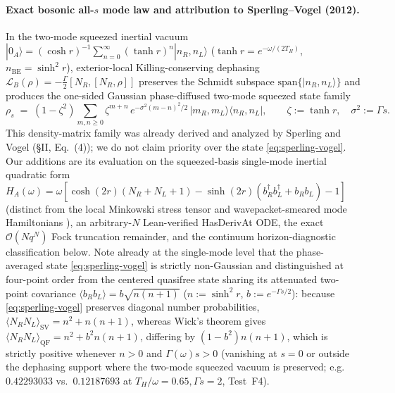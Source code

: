 \documentclass[11pt,a4paper]{article}
\theoremstyle{definition}
\theoremstyle{remark}
\newcommand{\cL}{\mathcal{L}}
\newcommand{\1}{\mathbf{1}}
\newcommand{\code}[1]{{\scriptsize\ttfamily #1}}
\begin{document}
\paragraph{Exact bosonic all-$s$ mode law and attribution to Sperling--Vogel (2012).}
In the two-mode squeezed inertial vacuum $|0_A\rangle = (\cosh r)^{-1}\sum_{n=0}^\infty (\tanh r)^n |n_R,n_L\rangle$ ($\tanh r = e^{-\omega/(2T_H)}$, $n_{\mathrm{BE}}=\sinh^2 r$), exterior-local Killing-conserving dephasing $\cL_B(\rho)=-\frac{\Gamma}{2}[N_R,[N_R,\rho]]$ preserves the Schmidt subspace $\mathrm{span}\{|n_R,n_L\rangle\}$ and produces the one-sided Gaussian phase-diffused two-mode squeezed state family
\begin{equation}\label{eq:sperling-vogel}
  \rho_s \;=\; (1-\zeta^2)\sum_{m,n\ge 0} \zeta^{m+n}\,e^{-\sigma^2(m-n)^2/2}\,|m_R,m_L\rangle\langle n_R,n_L|, \qquad
  \zeta := \tanh r,\quad \sigma^2 := \Gamma s.
\end{equation}
This density-matrix family was already derived and analyzed by Sperling and Vogel \cite{SperlingVogel2012} (\S II, Eq.~(4)); we do not claim priority over the state \eqref{eq:sperling-vogel}. Our additions are its evaluation on the squeezed-basis single-mode inertial quadratic form $H_A(\omega) = \omega[\cosh(2r)(N_R+N_L+1)-\sinh(2r)(b_R^\dagger b_L^\dagger+b_R b_L)-1]$ (distinct from the local Minkowski stress tensor and wavepacket-smeared mode Hamiltonians \cite{Bruschi2010}), an arbitrary-$N$ Lean-verified \code{HasDerivAt} ODE, the exact $\mathcal{O}(Nq^N)$ Fock truncation remainder, and the continuum horizon-diagnostic classification below. Note already at the single-mode level that the phase-averaged state \eqref{eq:sperling-vogel} is strictly non-Gaussian and distinguished at four-point order from the centered quasifree state sharing its attenuated two-point covariance $\langle b_R b_L\rangle = b\sqrt{n(n+1)}$ ($n:=\sinh^2 r$, $b:=e^{-\Gamma s/2}$): because \eqref{eq:sperling-vogel} preserves diagonal number probabilities, $\langle N_R N_L\rangle_{\mathrm{SV}} = n^2 + n(n+1)$, whereas Wick's theorem gives $\langle N_R N_L\rangle_{\mathrm{QF}} = n^2 + b^2 n(n+1)$, differing by $(1-b^2)n(n+1)$, which is strictly positive whenever $n>0$ and $\Gamma(\omega)s>0$ (vanishing at $s=0$ or outside the dephasing support where the two-mode squeezed vacuum is preserved; e.g.\ $0.42293033$ vs.\ $0.12187693$ at $T_H/\omega=0.65, \Gamma s=2$, Test~F4).
\end{document}
